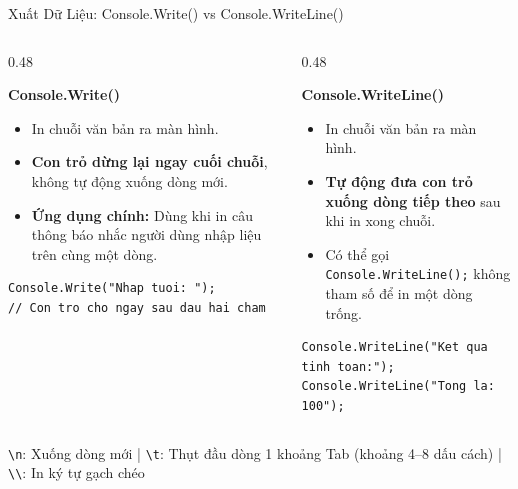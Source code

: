 \documentclass[aspectratio=169, 10pt]{beamer}
\begin{document}
\begin{frame}[fragile]{Xuất Dữ Liệu: Console.Write() vs Console.WriteLine()}
  \begin{columns}[T]
    \begin{column}{0.48\textwidth}
      \begin{block}{\textbf{Console.Write()}}
        \begin{itemize}
          \item In chuỗi văn bản ra màn hình.
          \item \textbf{Con trỏ dừng lại ngay cuối chuỗi}, không tự động xuống dòng mới.
          \item \textbf{Ứng dụng chính:} Dùng khi in câu thông báo nhắc người dùng nhập liệu trên cùng một dòng.
        \end{itemize}
\begin{lstlisting}
Console.Write("Nhap tuoi: ");
// Con tro cho ngay sau dau hai cham
\end{lstlisting}
      \end{block}
    \end{column}
    \begin{column}{0.48\textwidth}
      \begin{block}{\textbf{Console.WriteLine()}}
        \begin{itemize}
          \item In chuỗi văn bản ra màn hình.
          \item \textbf{Tự động đưa con trỏ xuống dòng tiếp theo} sau khi in xong chuỗi.
          \item Có thể gọi \texttt{Console.WriteLine();} không tham số để in một dòng trống.
        \end{itemize}
\begin{lstlisting}
Console.WriteLine("Ket qua tinh toan:");
Console.WriteLine("Tong la: 100");
\end{lstlisting}
      \end{block}
    \end{column}
  \end{columns}
  \begin{tcolorbox}[colback=UniLightBlue!30,colframe=UniBlue,title=\textbf{Ký tự thoát (Escape Sequences) thông dụng}]
    \texttt{\textbackslash n}: Xuống dòng mới \quad | \quad \texttt{\textbackslash t}: Thụt đầu dòng 1 khoảng Tab (khoảng 4--8 dấu cách) \quad | \quad \texttt{\textbackslash\textbackslash}: In ký tự gạch chéo
  \end{tcolorbox}
\end{frame}
\end{document}
